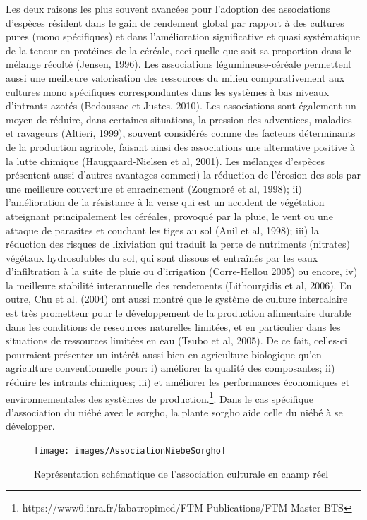 \documentclass[a4paper,11pt]{article}
\begin{document}
Les deux raisons les plus souvent avancées pour l’adoption des
associations d’espèces résident dans le gain de rendement global par
rapport à des cultures pures (mono spécifiques) et dans l’amélioration
significative et quasi systématique de la teneur en protéines de la
céréale, ceci quelle que soit sa proportion dans le mélange récolté
(Jensen, 1996). Les associations légumineuse-céréale permettent aussi
une meilleure valorisation des ressources du milieu comparativement
aux cultures mono spécifiques correspondantes dans les systèmes à bas
niveaux d’intrants azotés (Bedoussac et Justes, 2010). Les
associations sont également un moyen de réduire, dans certaines
situations, la pression des adventices, maladies et ravageurs
(Altieri, 1999), souvent considérés comme des facteurs déterminants de
la production agricole, faisant ainsi des associations une alternative
positive à la lutte chimique (Hauggaard-Nielsen et al, 2001). Les
mélanges d’espèces présentent aussi d’autres avantages comme:i) la
réduction de l’érosion des sols par une meilleure couverture et
enracinement (Zougmoré et al, 1998); ii) l’amélioration de la
résistance à la verse qui est un accident de végétation atteignant
principalement les céréales, provoqué par la pluie, le vent ou une
attaque de parasites et couchant les tiges au sol (Anil et al, 1998);
 iii) la réduction des risques de lixiviation qui traduit la perte de
nutriments (nitrates) végétaux hydrosolubles du sol, qui sont dissous
et entraînés par les eaux d’infiltration à la suite de pluie ou
d’irrigation (Corre-Hellou 2005) ou encore, iv) la meilleure stabilité
interannuelle des rendements (Lithourgidis et al, 2006). En outre, Chu
et al. (2004) ont aussi montré que le système de culture intercalaire
est très prometteur pour le développement de la production alimentaire
durable dans les conditions de ressources naturelles limitées, et en
particulier dans les situations de ressources limitées en eau (Tsubo
et al, 2005). De ce fait, celles-ci pourraient présenter un intérêt
aussi bien en agriculture biologique qu’en agriculture conventionnelle
pour: i) améliorer la qualité des composantes; ii) réduire les
intrants chimiques; iii) et améliorer les performances économiques et
environnementales des systèmes de production.\footnote{https://www6.inra.fr/fabatropimed/FTM-Publications/FTM-Master-BTS}.
Dans le cas spécifique d’association du niébé avec le sorgho, la
plante sorgho aide celle du niébé à se développer.


\begin{figure}%
  \begin{center}
   \texttt{[image: images/AssociationNiebeSorgho]}
\end{center}
\caption{ Représentation schématique de l'association culturale en champ réel}
\end{figure}
\end{document}
